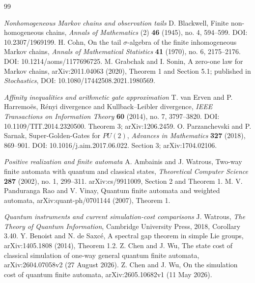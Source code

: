 \begin{thebibliography}{99}
\item[]\textit{Nonhomogeneous Markov chains and observation tails}
 D. Blackwell, Finite non-homogeneous chains, \emph{Annals of Mathematics} (2) \textbf{46} (1945), no. 4, 594--599. DOI: 10.2307/1969199.
 H. Cohn, On the tail $\sigma$-algebra of the finite inhomogeneous Markov chains, \emph{Annals of Mathematical Statistics} \textbf{41} (1970), no. 6, 2175--2176. DOI: 10.1214/aoms/1177696725.
 M. Grabchak and I. Sonin, A zero-one law for Markov chains, arXiv:2011.04063 (2020), Theorem 1 and Section 5.1; published in \emph{Stochastics}, DOI: 10.1080/17442508.2021.1980569.
\item[]\textit{Affinity inequalities and arithmetic gate approximation}
 T. van Erven and P. Harremo\"es, R\'enyi divergence and Kullback--Leibler divergence, \emph{IEEE Transactions on Information Theory} \textbf{60} (2014), no. 7, 3797--3820. DOI: 10.1109/TIT.2014.2320500. Theorem 3; arXiv:1206.2459.
 O. Parzanchevski and P. Sarnak, Super-Golden-Gates for $PU(2)$, \emph{Advances in Mathematics} \textbf{327} (2018), 869--901. DOI: 10.1016/j.aim.2017.06.022. Section 3; arXiv:1704.02106.
\item[]\textit{Positive realization and finite automata}
 A. Ambainis and J. Watrous, Two-way finite automata with quantum and classical states, \emph{Theoretical Computer Science} \textbf{287} (2002), no. 1, 299--311. arXiv:cs/9911009, Section 2 and Theorem 1.
 M. V. Panduranga Rao and V. Vinay, Quantum finite automata and weighted automata, arXiv:quant-ph/0701144 (2007), Theorem 1.

\item[]\textit{Quantum instruments and current simulation-cost comparisons}
 J. Watrous, \emph{The Theory of Quantum Information},
Cambridge University Press, 2018, Corollary 3.40.
 Y. Benoist and N. de Saxc\'e, A spectral gap theorem
in simple Lie groups, arXiv:1405.1808 (2014), Theorem 1.2.
 Z. Chen and J. Wu, The state cost of classical
simulation of one-way general quantum finite automata,
arXiv:2604.07058v2 (27 August 2026).
 Z. Chen and J. Wu, On the simulation cost of
quantum finite automata, arXiv:2605.10682v1 (11 May 2026).
\end{thebibliography}
